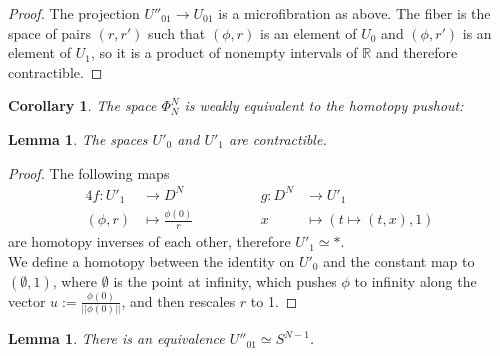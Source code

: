 \documentclass[12pt]{amsart}
\theoremstyle{plain}
\newtheorem{cor}[teo]{Corollary}
\newtheorem{lem}[teo]{Lemma}
\theoremstyle{definition}
\theoremstyle{remark}
\begin{document}
    \begin{proof}
    The projection $U''_{01}\rightarrow U_{01}$ is a microfibration as above. The fiber is the space of pairs $(r,r')$ such that $(\phi, r)$ is an element of $U_0$ and $(\phi, r')$ is an element of $U_1$, so it is a product of nonempty intervals of $\mathbb{R}$ and therefore contractible.
    \end{proof}
    
    \begin{cor}
    The space $\Phi_N^N$ is weakly equivalent to the homotopy pushout:
        \begin{center}
        \end{center}
    \end{cor}

    \begin{lem}
        The spaces $U'_0$ and $U'_1$ are contractible.
    \end{lem}

    \begin{proof}
    The following maps
    \begin{alignat*}{4}
        f: U'_1 &\rightarrow D^{N} \qquad \qquad &g: D^{N}&\rightarrow U'_1\\
        (\phi,r)&\mapsto \frac{\phi(0)}{r}\qquad \qquad &x &\mapsto (t\mapsto (t,x),1)
    \end{alignat*}
    are homotopy inverses of each other, therefore $U'_1\simeq *$.\\
    We define a homotopy between the identity on $U'_0$ and the constant map to $(\emptyset,1)$, where $\emptyset$ is the point at infinity,
    which pushes $\phi$ to infinity along the vector $u:= \frac{\phi(0)}{\vert\vert\phi(0)\vert\vert}$, and then rescales $r$ to 1.
    \end{proof}

    \begin{lem}
    There is an equivalence $U''_{01}\simeq S^{N-1}$.
    \end{lem}
        
\end{document}

